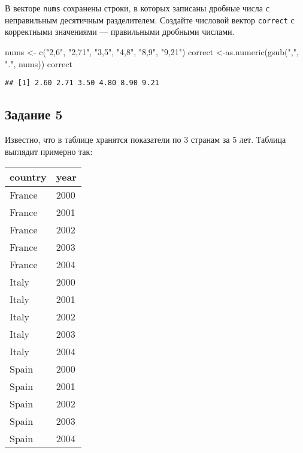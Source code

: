 \documentclass[
]{article}
\newenvironment{Shaded}{\begin{snugshade}}{\end{snugshade}}
\newcommand{\FunctionTok}[1]{\textcolor[rgb]{0.00,0.00,0.00}{#1}}
\newcommand{\NormalTok}[1]{#1}
\newcommand{\OtherTok}[1]{\textcolor[rgb]{0.56,0.35,0.01}{#1}}
\newcommand{\StringTok}[1]{\textcolor[rgb]{0.31,0.60,0.02}{#1}}
\begin{document}
В векторе \texttt{nums} сохранены строки, в которых записаны дробные
числа с неправильным десятичным разделителем. Создайте числовой вектор
\texttt{correct} с корректными значениями --- правильными дробными
числами.

\begin{Shaded}
\begin{Highlighting}[]
\NormalTok{nums }\OtherTok{\textless{}{-}} \FunctionTok{c}\NormalTok{(}\StringTok{"2,6"}\NormalTok{, }\StringTok{"2,71"}\NormalTok{, }\StringTok{"3,5"}\NormalTok{, }\StringTok{"4,8"}\NormalTok{, }\StringTok{"8,9"}\NormalTok{, }\StringTok{"9,21"}\NormalTok{)}
\NormalTok{correct }\OtherTok{\textless{}{-}}\FunctionTok{as.numeric}\NormalTok{(}\FunctionTok{gsub}\NormalTok{(}\StringTok{","}\NormalTok{, }\StringTok{"."}\NormalTok{, nums))}
\NormalTok{correct}
\end{Highlighting}
\end{Shaded}

\begin{verbatim}
## [1] 2.60 2.71 3.50 4.80 8.90 9.21
\end{verbatim}

\hypertarget{ux437ux430ux434ux430ux43dux438ux435-5}{%
\subsection{Задание 5}\label{ux437ux430ux434ux430ux43dux438ux435-5}}

Известно, что в таблице хранятся показатели по 3 странам за 5 лет.
Таблица выглядит примерно так:

\begin{table}[]
\centering
\begin{tabular}{|l|l|}
\hline
\textbf{country} & \textbf{year} \\ \hline
France           & 2000          \\ \hline
France           & 2001          \\ \hline
France           & 2002          \\ \hline
France           & 2003          \\ \hline
France           & 2004          \\ \hline
Italy            & 2000          \\ \hline
Italy            & 2001          \\ \hline
Italy            & 2002          \\ \hline
Italy            & 2003          \\ \hline
Italy            & 2004          \\ \hline
Spain            & 2000          \\ \hline
Spain            & 2001          \\ \hline
Spain            & 2002          \\ \hline
Spain            & 2003          \\ \hline
Spain            & 2004          \\ \hline
\end{tabular}
\end{table}
\end{document}
